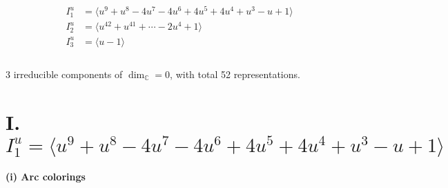 \documentclass[1p]{elsarticle_modified}
\theoremstyle{definition}
\begin{document}
\begin{align*}
I^u_{1}&=\langle 
u^9+u^8-4 u^7-4 u^6+4 u^5+4 u^4+u^3- u+1\rangle \\
I^u_{2}&=\langle 
u^{42}+u^{41}+\cdots-2 u^4+1\rangle \\
I^u_{3}&=\langle 
u-1\rangle \\
\\
\end{align*}
\raggedright * 3 irreducible components of $\dim_{\mathbb{C}}=0$, with total 52 representations.\\
\newpage
\renewcommand{\arraystretch}{1}
\centering \section*{I. $I^u_{1}= \langle u^9+u^8-4 u^7-4 u^6+4 u^5+4 u^4+u^3- u+1 \rangle$}
\flushleft \textbf{(i) Arc colorings}\\
\end{document}
